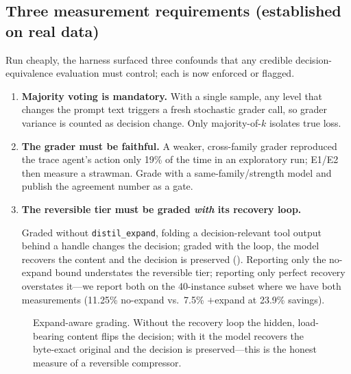 \documentclass{article}
\begin{document}
\subsection{Three measurement requirements (established on real data)}
Run cheaply, the harness surfaced three confounds that any credible
decision-equivalence evaluation must control; each is now enforced or flagged.
\begin{enumerate}
  \item \textbf{Majority voting is mandatory.} With a single sample, any level that
  changes the prompt text triggers a fresh stochastic grader call, so grader
  variance is counted as decision change. Only majority-of-$k$ isolates true loss.
  \item \textbf{The grader must be faithful.} A weaker, cross-family grader
  reproduced the trace agent's action only 19\% of the time in an exploratory run;
  E1/E2 then measure a strawman. Grade with a same-family/strength model and publish
  the agreement number as a gate.
  \item \textbf{The reversible tier must be graded \emph{with} its recovery loop.}
  {\sloppy
  Graded without \texttt{distil\_expand}, folding a decision-relevant tool output
  behind a handle changes the decision; graded with the loop, the model recovers the
  content and the decision is preserved (). Reporting only the
  no-expand bound understates the reversible tier; reporting only perfect recovery
  overstates it---we report both on the 40-instance subset where we have both
  measurements (11.25\% no-expand vs.\ 7.5\% $+$expand at 23.9\% savings).\par}
\end{enumerate}

\begin{figure}[t]
\centering
{}
\caption{Expand-aware grading. Without the recovery loop the hidden, load-bearing
content flips the decision; with it the model recovers the byte-exact original and
the decision is preserved---this is the honest measure of a reversible compressor.}
\label{fig:expand}
\end{figure}
\end{document}
